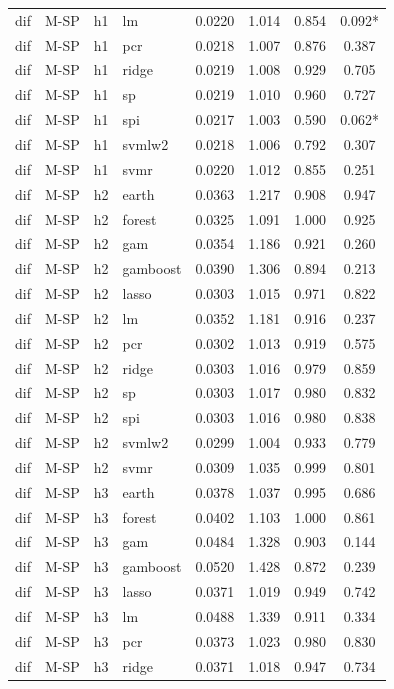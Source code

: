 \begin{ThreePartTable}
\begin{longtable}[t]{llclcccc}
dif & M-SP & h1 & lm & 0.0220 & 1.014 & 0.854 & 0.092*\\
dif & M-SP & h1 & pcr & 0.0218 & 1.007 & 0.876 & 0.387\\
dif & M-SP & h1 & ridge & 0.0219 & 1.008 & 0.929 & 0.705\\
dif & M-SP & h1 & sp & 0.0219 & 1.010 & 0.960 & 0.727\\
dif & M-SP & h1 & spi & 0.0217 & 1.003 & 0.590 & 0.062*\\
dif & M-SP & h1 & svmlw2 & 0.0218 & 1.006 & 0.792 & 0.307\\
dif & M-SP & h1 & svmr & 0.0220 & 1.012 & 0.855 & 0.251\\
\addlinespace
dif & M-SP & h2 & earth & 0.0363 & 1.217 & 0.908 & 0.947\\
dif & M-SP & h2 & forest & 0.0325 & 1.091 & 1.000 & 0.925\\
dif & M-SP & h2 & gam & 0.0354 & 1.186 & 0.921 & 0.260\\
dif & M-SP & h2 & gamboost & 0.0390 & 1.306 & 0.894 & 0.213\\
dif & M-SP & h2 & lasso & 0.0303 & 1.015 & 0.971 & 0.822\\
dif & M-SP & h2 & lm & 0.0352 & 1.181 & 0.916 & 0.237\\
dif & M-SP & h2 & pcr & 0.0302 & 1.013 & 0.919 & 0.575\\
dif & M-SP & h2 & ridge & 0.0303 & 1.016 & 0.979 & 0.859\\
dif & M-SP & h2 & sp & 0.0303 & 1.017 & 0.980 & 0.832\\
dif & M-SP & h2 & spi & 0.0303 & 1.016 & 0.980 & 0.838\\
dif & M-SP & h2 & svmlw2 & 0.0299 & 1.004 & 0.933 & 0.779\\
dif & M-SP & h2 & svmr & 0.0309 & 1.035 & 0.999 & 0.801\\
\addlinespace
dif & M-SP & h3 & earth & 0.0378 & 1.037 & 0.995 & 0.686\\
dif & M-SP & h3 & forest & 0.0402 & 1.103 & 1.000 & 0.861\\
dif & M-SP & h3 & gam & 0.0484 & 1.328 & 0.903 & 0.144\\
dif & M-SP & h3 & gamboost & 0.0520 & 1.428 & 0.872 & 0.239\\
dif & M-SP & h3 & lasso & 0.0371 & 1.019 & 0.949 & 0.742\\
dif & M-SP & h3 & lm & 0.0488 & 1.339 & 0.911 & 0.334\\
dif & M-SP & h3 & pcr & 0.0373 & 1.023 & 0.980 & 0.830\\
dif & M-SP & h3 & ridge & 0.0371 & 1.018 & 0.947 & 0.734\\

\end{longtable}
\end{ThreePartTable}
